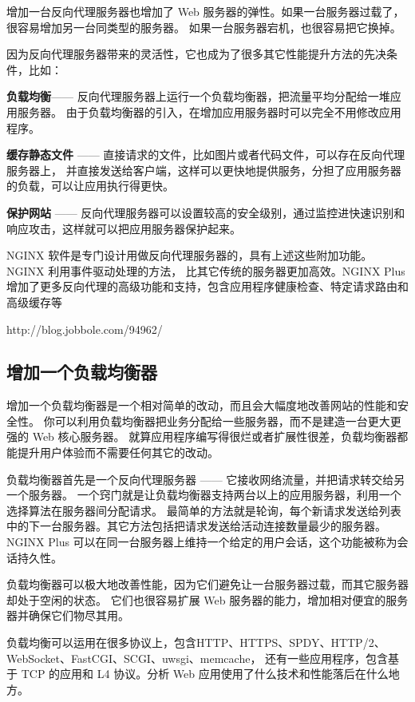 \documentclass{book}
\begin{document}
增加一台反向代理服务器也增加了 Web 服务器的弹性。如果一台服务器过载了，很容易增加另一台同类型的服务器。
如果一台服务器宕机，也很容易把它换掉。

因为反向代理服务器带来的灵活性，它也成为了很多其它性能提升方法的先决条件，比如：

\textbf{负载均衡}—— 反向代理服务器上运行一个负载均衡器，把流量平均分配给一堆应用服务器。
由于负载均衡器的引入，在增加应用服务器时可以完全不用修改应用程序。

\textbf{缓存静态文件} —— 直接请求的文件，比如图片或者代码文件，可以存在反向代理服务器上，
并直接发送给客户端，这样可以更快地提供服务，分担了应用服务器的负载，可以让应用执行得更快。

\textbf{保护网站} —— 反向代理服务器可以设置较高的安全级别，通过监控进快速识别和响应攻击，这样就可以把应用服务器保护起来。

NGINX 软件是专门设计用做反向代理服务器的，具有上述这些附加功能。NGINX 利用事件驱动处理的方法，
比其它传统的服务器更加高效。NGINX Plus 增加了更多反向代理的高级功能和支持，包含应用程序健康检查、特定请求路由和高级缓存等

http://blog.jobbole.com/94962/

\subsection{增加一个负载均衡器}

增加一个负载均衡器是一个相对简单的改动，而且会大幅度地改善网站的性能和安全性。
你可以利用负载均衡器把业务分配给一些服务器，而不是建造一台更大更强的 Web 核心服务器。
就算应用程序编写得很烂或者扩展性很差，负载均衡器都能提升用户体验而不需要任何其它的改动。

负载均衡器首先是一个反向代理服务器 —— 它接收网络流量，并把请求转交给另一个服务器。
一个窍门就是让负载均衡器支持两台以上的应用服务器，利用一个选择算法在服务器间分配请求。
最简单的方法就是轮询，每个新请求发送给列表中的下一台服务器。其它方法包括把请求发送给活动连接数量最少的服务器。
NGINX Plus 可以在同一台服务器上维持一个给定的用户会话，这个功能被称为会话持久性。

负载均衡器可以极大地改善性能，因为它们避免让一台服务器过载，而其它服务器却处于空闲的状态。
它们也很容易扩展 Web 服务器的能力，增加相对便宜的服务器并确保它们物尽其用。

负载均衡可以运用在很多协议上，包含HTTP、HTTPS、SPDY、HTTP/2、WebSocket、FastCGI、SCGI、uwsgi、memcache，
还有一些应用程序，包含基于 TCP 的应用和 L4 协议。分析 Web 应用使用了什么技术和性能落后在什么地方。
\end{document}
